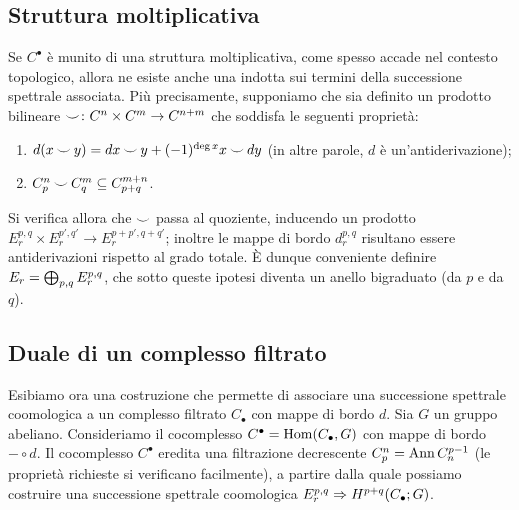 \subsection{Struttura moltiplicativa}\label{cohomological-spectral-sequence:multiplicative-structure}
Se \(C^\bullet\) è munito di una struttura moltiplicativa, come spesso accade nel contesto topologico, allora ne esiste anche una indotta sui termini della successione spettrale associata. Più precisamente, supponiamo che sia definito un prodotto bilineare \(\map{\cupp}{C^n\times C^m}{C^{n+m}}\) che soddisfa le seguenti proprietà:
\begin{enumerate}
\item \(d(x\mathbin{\smile} y)=dx\mathbin{\smile} y+(-1)^{\deg x}x\mathbin{\smile} dy\) (in altre parole, \(d\) è un'antiderivazione);
\item \(C^n_p\mathbin{\smile} C^m_q\subseteq C^{m+n}_{p+q}\).
\end{enumerate}
Si verifica  allora che \(\mathbin{\smile}\) passa al quoziente, inducendo un prodotto \(E^{p,q}_r\times E^{p',q'}_r\to E^{p+p',q+q'}_r\); inoltre le mappe di bordo \(d^{p,q}_r\) risultano essere antiderivazioni rispetto al grado totale. È dunque conveniente definire \(E_r=\bigoplus_{p,q}E^{p,q}_r\), che sotto queste ipotesi diventa un anello bigraduato (da \(p\) e da \(q\)).

\subsection{Duale di un complesso filtrato}\label{cohomological-spectral-sequence:dual-complex}
Esibiamo ora una costruzione che permette di associare una successione spettrale coomologica a un complesso filtrato \(C_\bullet\) con mappe di bordo \(d\). Sia \(G\) un gruppo abeliano. Consideriamo il cocomplesso \(C^\bullet=\operatorname{Hom}(C_\bullet,G)\) con mappe di bordo \(-\circ d\). Il cocomplesso \(C^\bullet\) eredita una filtrazione decrescente \(C^n_p=\operatorname{Ann} C_n^{p-1}\) (le proprietà richieste si verificano facilmente), a partire dalla quale possiamo costruire una successione spettrale coomologica \(E^{p,q}_r\Rightarrow H^{p+q}(C_\bullet;G)\).

